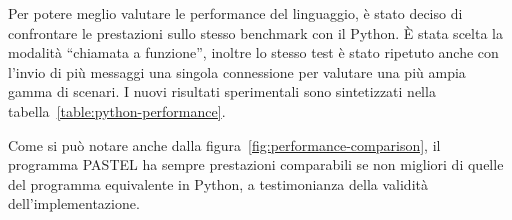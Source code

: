 \documentclass[]{article}
\begin{document}
\begin{table}[htbp]
	\centering
	\caption{Tempo necessario per l'invio di un numero crescente di messaggi in Python, e in PASTEL con connessione singola}
	\label{table:python-performance}
\end{table}

Per potere meglio valutare le performance del linguaggio, è stato deciso di confrontare le prestazioni sullo stesso benchmark con il Python. È stata scelta la modalità ``chiamata a funzione'', inoltre lo stesso test è stato ripetuto anche con l'invio di più messaggi una singola connessione per valutare una più ampia gamma di scenari. I nuovi risultati sperimentali sono sintetizzati nella tabella~\ref{table:python-performance}.

Come si può notare anche dalla figura~\ref{fig:performance-comparison}, il programma PASTEL ha sempre prestazioni comparabili se non migliori di quelle del programma equivalente in Python, a testimonianza della validità dell'implementazione.
\end{document}
